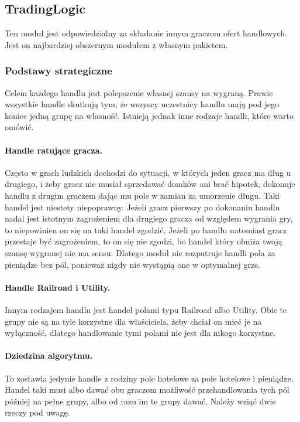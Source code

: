 \documentclass{article}
\begin{document}
\subsection{TradingLogic}

Ten moduł jest odpowiedzialny za składanie innym graczom ofert handlowych. Jest on najbardziej obszernym modułem z własnym pakietem.

\subsubsection{Podstawy strategiczne}

Celem każdego handlu jest polepszenie własnej szansy na wygraną. Prawie wszystkie handle skutkują tym, że wszyscy uczestnicy handlu mają pod jego koniec jedną grupę na własność. Istnieją jednak inne rodzaje handli, które warto omówić. 
\paragraph{Handle ratujące gracza.}
Często w grach ludzkich dochodzi do sytuacji, w których jeden gracz ma dług u drugiego, i żeby gracz nie musiał sprzedawać domków ani brać hipotek, dokonuje handlu z drugim graczem dając mu pole w zamian za umorzenie długu. Taki handel jest niestety niepoprawny. Jeżeli gracz pierwszy po dokonaniu handlu nadal jest istotnym zagrożeniem dla drugiego gracza od względem wygrania gry, to niepowinien on się na taki handel zgodzić. Jeżeli po handlu natomiast gracz przestaje być zagrożeniem, to on się nie zgodzi, bo handel który obniża twoją szansę wygranej nie ma sensu. Dlatego moduł nie rozpatruje handli pola za pieniądze bez pól, ponieważ nigdy nie wystąpią one w optymalnej grze.
\paragraph{Handle Railroad i Utility.}
Innym rodzajem handlu jest handel polami typu Railroad albo Utility. Obie te grupy nie są na tyle korzystne dla właściciela, żeby chciał on mieć je na wyłączność, dlatego handlowanie tymi polami nie jest dla nikogo korzystne.
\paragraph{Dziedzina algorytmu.}
To zostawia jedynie handle z rodziny pole hotelowe za pole hotelowe i pieniądze. Handel taki musi albo dawać obu graczom możliwość przehandlowania tych pól później na pełne grupy, albo od razu im te grupy dawać. Należy wziąć dwie rzeczy pod uwagę.
\end{document}
